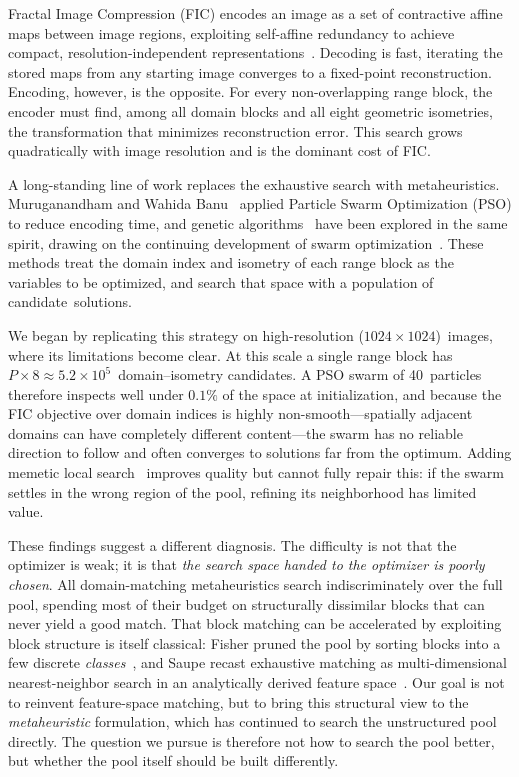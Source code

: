 \documentclass[conference, a4paper]{IEEEtran}
\begin{document}
Fractal Image Compression (FIC) encodes an image as a set of contractive affine maps between image regions, exploiting self-affine redundancy to achieve compact, resolution-independent representations~\cite{Barnsley1985, FICOriginal}. Decoding is fast, iterating the stored maps from any starting image converges to a fixed-point reconstruction. Encoding, however, is the opposite. For every non-overlapping range block, the encoder must find, among all domain blocks and all eight geometric isometries, the transformation that minimizes reconstruction error. This search grows quadratically with image resolution and is the dominant cost of FIC.

A long-standing line of work replaces the exhaustive search with metaheuristics. Muruganandham and Wahida Banu~\cite{PSOFIC} applied Particle Swarm Optimization (PSO) to reduce encoding time, and genetic algorithms~\cite{wu2007schema, wu2006spatial, mitra1998technique} have been explored in the same spirit, drawing on the continuing development of swarm optimization~\cite{li2022pyramid}. These methods treat the domain index and isometry of each range block as the variables to be optimized, and search that space with a population of candidate~solutions.

We began by replicating this strategy on high-resolution (\mbox{$1024\times1024$})~images, where its limitations become clear. At this scale a single range block has \mbox{$P\!\times\!8 \approx 5.2\times10^5$}~domain--isometry candidates. A PSO swarm of 40~particles therefore inspects well under \mbox{$0.1\%$} of the space at initialization, and because the FIC objective over domain indices is highly non-smooth---spatially adjacent domains can have completely different content---the swarm has no reliable direction to follow and often converges to solutions far from the optimum. Adding memetic local search~\cite{moscato1989evolution} improves quality but cannot fully repair this: if the swarm settles in the wrong region of the pool, refining its neighborhood has limited value.

These findings suggest a different diagnosis. The difficulty is not that the optimizer is weak; it is that \emph{the search space handed to the optimizer is poorly chosen}. All domain-matching metaheuristics search indiscriminately over the full pool, spending most of their budget on structurally dissimilar blocks that can never yield a good match. That block matching can be accelerated by exploiting block structure is itself classical: Fisher pruned the pool by sorting blocks into a few discrete \emph{classes}~\cite{compression1995fractal}, and Saupe recast exhaustive matching as multi-dimensional nearest-neighbor search in an analytically derived feature space~\cite{saupe1995accelerating}. Our goal is not to reinvent feature-space matching, but to bring this structural view to the \emph{metaheuristic} formulation, which has continued to search the unstructured pool directly. The question we pursue is therefore not how to search the pool better, but whether the pool itself should be built differently.
\end{document}
